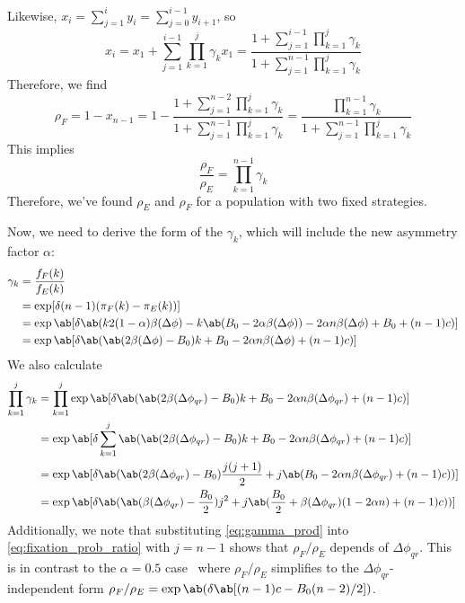 \documentclass[10pt,letterpaper]{article}
\begin{document}
Likewise, $x_i = \sum_{j=1}^i y_i = \sum_{j=0}^{i-1} y_{i+1}$, so
\begin{equation*}
  x_i
  = x_1 + \sum_{j=1}^{i-1} \prod_{k=1}^j \gamma_k x_1
  = \frac{1 + \sum_{j=1}^{i-1} \prod_{k=1}^j \gamma_k}
    {1 + \sum_{j=1}^{n-1} \prod_{k=1}^j \gamma_k}
\end{equation*}
Therefore, we find
\begin{equation*}
  \rho_F = 1 - x_{n-1}
  = 1 - \frac{1 + \sum_{j=1}^{n-2} \prod_{k=1}^j \gamma_k}
    {1 + \sum_{j=1}^{n-1} \prod_{k=1}^j \gamma_k}
  = \frac{\prod_{k=1}^{n-1} \gamma_k}{1 + \sum_{j=1}^{n-1} \prod_{k=1}^j \gamma_k}
\end{equation*}
This implies
\begin{equation}
  \frac{\rho_F}{\rho_E} = \prod_{k=1}^{n-1} \gamma_k
  \label{eq:fixation_prob_ratio}
\end{equation}
Therefore, we've found $\rho_E$ and $\rho_F$ for a population
with two fixed strategies.

Now, we need to derive the form of the $\gamma_k$,
which will include the new asymmetry factor $\alpha$:
\begin{align*}
  \gamma_k &= \frac{f_F(k)}{f_E(k)} \\
           &= \exp[\delta (n-1) (\pi_F(k) - \pi_E(k))]
           \\
           &= \exp\ab[\delta \ab(
    k 2 (1-\alpha) \beta(\Delta\phi)
    - k \ab(B_0 - 2 \alpha \beta(\Delta\phi))
                 - 2 \alpha n \beta(\Delta\phi) + B_0 + (n-1) c)] \\
      &= \exp\ab[\delta \ab(
    \ab(2 \beta(\Delta\phi) - B_0) k
                 + B_0 - 2 \alpha n \beta(\Delta\phi) + (n-1) c)]
\end{align*}
We also calculate
\begin{equation}
  \begin{aligned}
    \prod_{k=1}^j  \gamma_k
      &= \prod_{k=1}^j \exp\ab[\delta \ab(
      \ab(2 \beta(\Delta\phi_{qr}) - B_0) k
      + B_0 - 2 \alpha n \beta(\Delta\phi_{qr}) + (n-1) c)]
      \\
      &= \exp\ab[\delta \sum_{k=1}^j \ab(
      \ab(2 \beta(\Delta\phi_{qr}) - B_0) k
      + B_0 - 2 \alpha n \beta(\Delta\phi_{qr}) + (n-1) c)]
      \\
      &= \exp\ab[\delta \ab(
      \ab(2 \beta(\Delta\phi_{qr}) - B_0) \frac{j(j+1)}{2}
      + j \ab(B_0 - 2 \alpha n \beta(\Delta\phi_{qr}) + (n-1) c))]
      \\
      &= \exp\ab[\delta \ab(
      \ab(\beta(\Delta\phi_{qr}) - \frac{B_0}{2}) j^2
      + j \ab(\frac{B_0}{2} + \beta(\Delta\phi_{qr}) (1 - 2 \alpha n)  + (n-1) c))]
  \end{aligned}
  \label{eq:gamma_prod}
\end{equation}
Additionally, we note that substituting
\cref{eq:gamma_prod} into \cref{eq:fixation_prob_ratio}
with $j=n-1$ shows that $\rho_F/\rho_E$
depends of $\Delta \phi_{qr}$.
This is in contrast to the $\alpha=0.5$ case~\cite{tripp2022evolutionary}
where $\rho_F/\rho_E$ simplifies to the $\Delta \phi_{qr}$-independent form
$\rho_F/\rho_E = \exp \ab(\delta \ab[(n-1)c - B_0 (n-2)/2])$.
\end{document}
